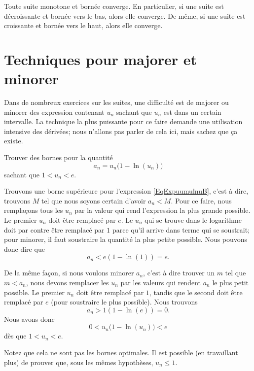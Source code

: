 \begin{proposition}		\label{Propsuiteborncv}
Toute suite monotone et bornée converge. En particulier, si une suite est décroissante et bornée vers le bas, alors elle converge. De même, si une suite est  croissante et bornée vers le haut, alors elle converge. 
\end{proposition}

\section{Techniques pour majorer et minorer}

Dans de nombreux exercices sur les suites, une difficulté est de majorer ou minorer des expression contenant $u_n$ sachant que $u_n$ est dans un certain intervalle. La technique la plus puissante pour ce faire demande une utilisation intensive des dérivées; nous n'allons pas parler de cela ici, mais sachez que ça existe.

\begin{example}
	Trouver	des bornes pour la quantité
	\begin{equation}		\label{EqExpuumulnuB}
		a_n=u_n\big( 1-\ln(u_n) \big)
	\end{equation}
	sachant que $1<u_n<e$.

	Trouvons une borne supérieure pour l'expression \eqref{EqExpuumulnuB}, c'est à dire, trouvons $M$ tel que nous soyons certain d'avoir $a_n<M$. Pour ce faire, nous remplaçons tous les $u_n$ par la valeur qui rend l'expression la plus grande possible. Le premier $u_n$ doit être remplacé par $e$. Le $u_n$ qui se trouve dans le logarithme doit par contre être remplacé par $1$ parce qu'il arrive dans terme qui se soustrait; pour minorer, il faut soustraire la quantité la plus petite possible. Nous pouvons donc dire que 
	\begin{equation}
		a_n<e(1-\ln(1))=e.
	\end{equation}
	
	De la même façon, si nous voulons minorer $a_n$, c'est à dire trouver un $m$ tel que $m<a_n$, nous devons remplacer les $u_n$ par les valeurs qui rendent $a_n$ le plus petit possible. Le premier $u_n$ doit être remplacé par $1$, tandis que le second doit être remplacé par $e$ (pour soustraire le plus possible). Nous trouvons
	\begin{equation}
		a_n>1(1-\ln(e))=0.
	\end{equation}
	Nous avons donc
	\begin{equation}
		0<u_n\big( 1-\ln(u_n) \big)<e
	\end{equation}
	dès que $1<u_n<e$.
	
	Notez que cela ne sont pas les bornes optimales. Il est possible (en travaillant plus) de prouver que, sous les mêmes hypothèses, $u_n\leq 1$.
\end{example}
